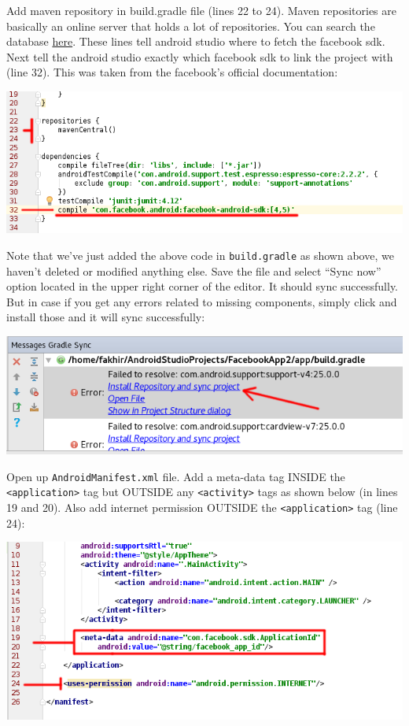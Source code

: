 Add maven repository in build.gradle file (lines 22 to 24). Maven repositories are basically an online server that holds a lot of repositories. You can search the database \href{http://search.maven.org/}{here}. These lines tell android studio where to fetch the facebook sdk. Next tell the android studio exactly which facebook sdk to link the project with (line 32). This was taken from the facebook's official documentation:

\begin{center}
	\includegraphics[scale=\SourceCodeScale]{chapters/ch12/images/13}
\end{center}

Note that we've just added the above code in \texttt{build.gradle} as shown above, we haven't deleted or modified anything else. Save the file and select ``Sync now'' option located in the upper right corner of the editor. It should sync successfully. But in case if you get any errors related to missing components, simply click and install those and it will sync successfully:

\begin{center}
	\includegraphics[scale=\SourceCodeScale]{chapters/ch12/images/14}
\end{center}

Open up \texttt{AndroidManifest.xml} file. Add a meta-data tag INSIDE the \texttt{<application>} tag but OUTSIDE any \texttt{<activity>} tags as shown below (in lines 19 and 20). Also add internet permission OUTSIDE the \texttt{<application>} tag (line 24):

\begin{center}
	\includegraphics[scale=\SourceCodeScale]{chapters/ch12/images/11}
\end{center}

